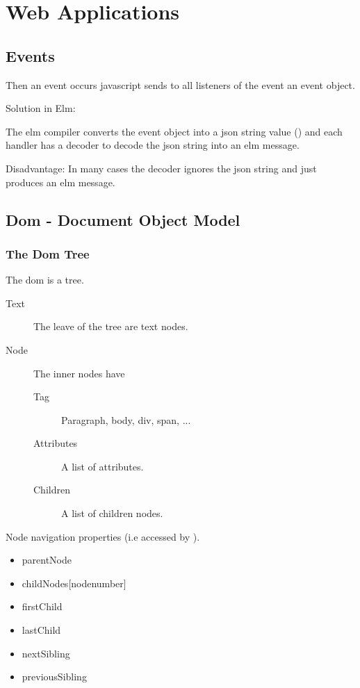 \chapter{Web Applications}
\label{chapter:web}



\section{Events}

Then an event occurs javascript sends to all listeners of the event an event
object.

Solution in Elm:

The elm compiler converts the event object into a json string value
() and each handler has a decoder to decode the json
string into an elm message.

Disadvantage: In many cases the decoder ignores the json string and just
produces an elm message.

\section{Dom - Document Object Model}
\label{sec:dom}


\subsection{The Dom Tree}

The dom is a tree.
\begin{description}
\item[Text] The leave of the tree are text nodes.
  
\item[Node] The inner nodes have

  \begin{description}
  \item[Tag] Paragraph, body, div, span, ...
  \item[Attributes] A list of attributes.
  \item[Children] A list of children nodes.
  \end{description}
  
\end{description}

Node navigation properties (i.e accessed by ).
\begin{itemize}
\item 
  parentNode
\item 
  childNodes[nodenumber]
\item 
  firstChild
\item 
  lastChild
\item 
  nextSibling
\item 
  previousSibling
\end{itemize}

